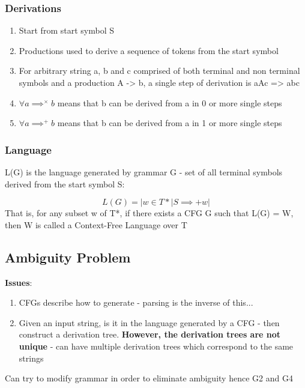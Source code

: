 \documentclass{article}
\newenvironment{cons}{\par\color{red}}{\par}
\begin{document}
\subsubsection{Derivations}
\begin{enumerate}
	\item Start from start symbol S
	\item Productions used to derive a sequence of tokens from the start symbol
	\item For arbitrary string a, b and c comprised of both terminal and non terminal symbols and a production A -> b, a single step of derivation is aAc => abc
	\item $\forall a \implies^{\times} b$ means that b can be derived from a in 0 or more single steps
	\item $\forall a \implies^{+} b$ means that b can be derived from a in 1 or more single steps
\end{enumerate}

\subsubsection{Language}
L(G) is the language generated by grammar G - set of all terminal symbols derived from the start symbol S:

\begin{equation}
L(G) = |w \in T * | S \implies + w|
\end{equation}
That is, for any subset w of T*, if there exists a CFG G such that L(G) = W, then W is called a Context-Free Language over T

\subsection{Ambiguity Problem}
\begin{cons}
	\textbf{Issues}:
	\begin{enumerate}
		\item CFGs describe how to generate - parsing is the inverse of this...
		\item Given an input string, is it in the language generated by a CFG - then construct a derivation tree. \textbf{However, the derivation trees are not unique} - can have multiple derivation trees which correspond to the same strings
	\end{enumerate}
\end{cons}


\noindent
Can try to modify grammar in order to eliminate ambiguity hence G2 and G4
\end{document}
